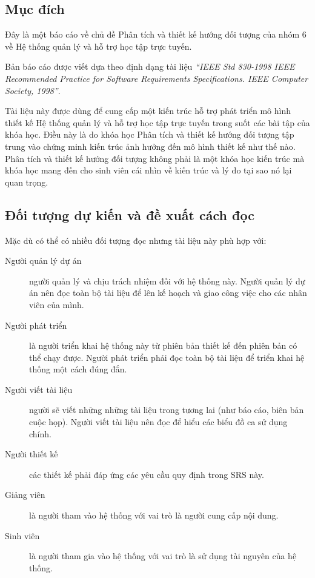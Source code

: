 \documentclass[./../main_file.tex]{subfiles}
\begin{document}
\subsection{Mục đích}

Đây là một báo cáo về chủ đề Phân tích và thiết kế hướng đối tượng của nhóm 6 về Hệ thống quản lý và hỗ trợ học tập trực tuyến. 


Bản báo cáo được viết dựa theo định dạng tài liệu \textit{“IEEE Std 830-1998 IEEE Recommended Practice for Software Requirements Specifications. IEEE Computer Society, 1998”}. 


Tài liệu này được dùng để cung cấp một kiến trúc hỗ trợ phát triển mô hình thiết kế  Hệ thống quản lý và hỗ trợ học tập trực tuyến trong suốt các bài tập của khóa học. Điều này là do khóa học Phân tích và thiết kế hướng đối tượng tập trung vào chứng minh kiến trúc ảnh hưởng đến mô hình thiết kế như thế nào. Phân tích và thiết kế hướng đối tượng không phải là một khóa học kiến trúc mà khóa học mang đến cho sinh viên cái nhìn về kiến trúc và lý do tại sao nó lại quan trọng.


\subsection{Đối tượng dự kiến và đề xuất cách đọc}

Mặc dù có thể có nhiều đối tượng đọc nhưng tài liệu này phù hợp với:

\begin{description}
	\item[Người quản lý dự án] người quản lý và chịu trách nhiệm đối với hệ thống này. Người quản lý dự án nên đọc toàn bộ tài liệu để lên kế hoạch và giao công việc cho các nhân viên của mình.
	\item[Người phát triển] là người triển khai hệ thống này từ phiên bản thiết kế đến phiên bản có thể chạy được. Người phát triển phải đọc toàn bộ tài liệu để triển khai hệ thống một cách đúng đắn.
\item[Người viết tài liệu] người sẽ viết những những tài liệu trong tương lai (như báo cáo, biên bản cuộc họp). Người viết tài liệu nên đọc để hiểu các biểu đồ ca sử dụng chính.
	\item[Người thiết kế] các thiết kế phải đáp ứng các yêu cầu quy định trong SRS này.
	\item[Giảng viên]là người tham vào hệ thống với vai trò là người cung cấp nội dung.
	\item[Sinh viên] là người tham gia vào hệ thống với vai trò là sử dụng tài nguyên của hệ thống. 
	
\end{description}
\end{document}
